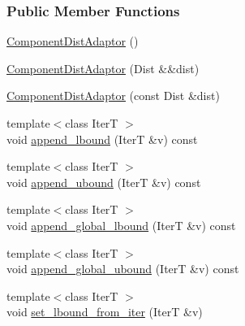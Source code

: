 \subsubsection*{Public Member Functions}
\begin{DoxyCompactItemize}
\item 
\hyperlink{classprior__hessian_1_1CompositeDist_1_1ComponentDistAdaptor_3_01Dist_00_01meta_1_1EnableIfSubcld67d34d533dbae21b9dad35557546eec_aa372d3fb62437336fc8f7a3a3ac8caa5}{Component\+Dist\+Adaptor} ()
\item 
\hyperlink{classprior__hessian_1_1CompositeDist_1_1ComponentDistAdaptor_3_01Dist_00_01meta_1_1EnableIfSubcld67d34d533dbae21b9dad35557546eec_abc9b7b676cc23645c44742725da1c845}{Component\+Dist\+Adaptor} (Dist \&\&dist)
\item 
\hyperlink{classprior__hessian_1_1CompositeDist_1_1ComponentDistAdaptor_3_01Dist_00_01meta_1_1EnableIfSubcld67d34d533dbae21b9dad35557546eec_aca7a45fb7693be6f480f9f0d95576933}{Component\+Dist\+Adaptor} (const Dist \&dist)
\item 
{\footnotesize template$<$class IterT $>$ }\\void \hyperlink{classprior__hessian_1_1CompositeDist_1_1ComponentDistAdaptor_3_01Dist_00_01meta_1_1EnableIfSubcld67d34d533dbae21b9dad35557546eec_a971c182cb228d2ba1406c32f2257d6e3}{append\+\_\+lbound} (IterT \&v) const 
\item 
{\footnotesize template$<$class IterT $>$ }\\void \hyperlink{classprior__hessian_1_1CompositeDist_1_1ComponentDistAdaptor_3_01Dist_00_01meta_1_1EnableIfSubcld67d34d533dbae21b9dad35557546eec_a3ef1a9a519a46a9690a69671a6b26869}{append\+\_\+ubound} (IterT \&v) const 
\item 
{\footnotesize template$<$class IterT $>$ }\\void \hyperlink{classprior__hessian_1_1CompositeDist_1_1ComponentDistAdaptor_3_01Dist_00_01meta_1_1EnableIfSubcld67d34d533dbae21b9dad35557546eec_a2f0eb100d5e7cb43679c3a97f2baa31c}{append\+\_\+global\+\_\+lbound} (IterT \&v) const 
\item 
{\footnotesize template$<$class IterT $>$ }\\void \hyperlink{classprior__hessian_1_1CompositeDist_1_1ComponentDistAdaptor_3_01Dist_00_01meta_1_1EnableIfSubcld67d34d533dbae21b9dad35557546eec_a4c54e572a1f7821dd8da1f33770ae1be}{append\+\_\+global\+\_\+ubound} (IterT \&v) const 
\item 
{\footnotesize template$<$class IterT $>$ }\\void \hyperlink{classprior__hessian_1_1CompositeDist_1_1ComponentDistAdaptor_3_01Dist_00_01meta_1_1EnableIfSubcld67d34d533dbae21b9dad35557546eec_a646e3f5f85f0ab6ebb89b9cd938f9073}{set\+\_\+lbound\+\_\+from\+\_\+iter} (IterT \&v)

\end{DoxyCompactItemize}
